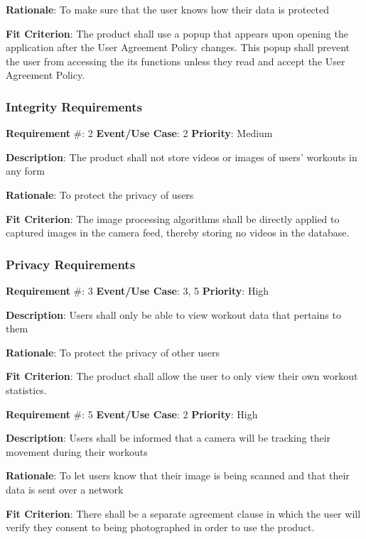 \documentclass{article}
\newcommand\tab{\hspace*{2cm}}
\begin{document}
\textbf{Rationale}: To make sure that the user knows how their data is protected

\textbf{Fit Criterion}: The product shall use a popup that appears upon opening the application after the User Agreement Policy changes. This popup shall prevent the user from accessing the its functions unless they read and accept the User Agreement Policy.

\medskip

\subsubsection{Integrity Requirements}

\textbf{Requirement} \#: 2 \tab \textbf{Event/Use Case}: 2 \tab \textbf{Priority}: Medium

\textbf{Description}: The product shall not store videos or images of users’ workouts in any form

\textbf{Rationale}: To protect the privacy of users

\textbf{Fit Criterion}: The image processing algorithms shall be directly applied to captured images in the camera feed, thereby storing no videos in the database.

\medskip

\subsubsection{Privacy Requirements}
\textbf{Requirement} \#: 3 \tab \textbf{Event/Use Case}: 3, 5 \tab \textbf{Priority}: High

\textbf{Description}: Users shall only be able to view workout data that pertains to them

\textbf{Rationale}: To protect the privacy of other users

\textbf{Fit Criterion}: The product shall allow the user to only view their own workout statistics.

\medskip

\textbf{Requirement} \#: 5 \tab \textbf{Event/Use Case}: 2 \tab \textbf{Priority}: High

\textbf{Description}: Users shall be informed that a camera will be tracking their movement during their workouts

\textbf{Rationale}: To let users know that their image is being scanned and that their data is sent over a network

\textbf{Fit Criterion}: There shall be a separate agreement clause in which the user will verify they consent to being photographed in order to use the product.
\end{document}
